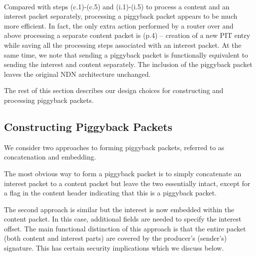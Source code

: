 \documentclass[conference]{IEEEtran}
\begin{document}
\\
\vspace{0.2cm}

Compared with steps (c.1)-(c.5) and (i.1)-(i.5) to process a content and an 
interest packet separately, processing a piggyback packet appears to be
much more efficient. In fact, the only extra action performed by a router
over and above processing a separate content packet is (p.4) -- creation of a new
PIT entry while saving all the processing steps associated with an interest packet. 
At the same time, we note that sending a piggyback packet is functionally 
equivalent to sending the interest and content separately.
The inclusion of the piggyback packet leaves the original  NDN architecture
unchanged.  

The rest of this section describes our design choices for constructing and processing 
piggyback packets.


\subsection{Constructing Piggyback Packets}
\label{sec:design-encoding}
We consider two approaches to forming piggyback packets, referred to as
concatenation and embedding.

The most obvious way to form a piggyback packet is to simply concatenate an interest
packet to a content packet but leave the two essentially intact, 
except for a flag in the content header indicating that this is a piggyback packet.

The second approach is similar but the interest is now embedded within 
the content packet. In this case, additional fields are needed to specify the interest offset. 
The main functional distinction of this approach is that the entire packet (both content and interest parts)
are covered by the producer's (sender's) signature. This has certain security implications which we
discuss below.
\end{document}
